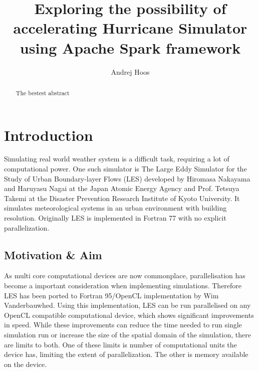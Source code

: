 \documentclass{l4proj}
\begin{document}
\title{Exploring the possibility of accelerating Hurricane Simulator using Apache Spark framework}
\author{Andrej Hoos}
\maketitle

\begin{abstract}
The bestest abstract
\end{abstract}

\educationalconsent
%
%
\tableofcontents

\chapter{Introduction}

Simulating real world weather system is a difficult task, requiring a lot of computational power.
One such simulator is The Large Eddy Simulator for the Study of Urban Boundary-layer Flows (LES)
developed by  Hiromasa Nakayama and Haruyasu Nagai at the Japan Atomic Energy Agency
and Prof. Tetsuya Takemi at the Disaster Prevention Research Institute of Kyoto University\cite{les_analysis}\cite{les}.
It simulates meteorological systems in an urban environment with building resolution.
Originally LES is implemented in Fortran 77 with no explicit parallelization.

\section{Motivation \& Aim}

As multi core computational devices are now commonplace, parallelisation has become
a important consideration when implementing simulations. Therefore LES has been
ported to Fortran 95/OpenCL implementation by Wim Vanderbauwhed\cite{les_wim}. Using this implementation,
LES can be run parallelised on any OpenCL compatible computational device, which shows
significant improvements in speed. While these improvements can reduce the time needed to
run single simulation run or increase the size of the spatial domain of the simulation,
there are limits to both. One of these limits is number of computational units the device has,
limiting the extent of parallelization. The other is memory available on the device.
\end{document}
